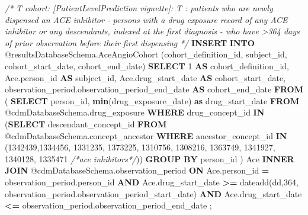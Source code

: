 \documentclass[
]{article}
\newenvironment{Shaded}{\begin{snugshade}}{\end{snugshade}}
\newcommand{\CommentTok}[1]{\textcolor[rgb]{0.56,0.35,0.01}{\textit{#1}}}
\newcommand{\DecValTok}[1]{\textcolor[rgb]{0.00,0.00,0.81}{#1}}
\newcommand{\FunctionTok}[1]{\textcolor[rgb]{0.13,0.29,0.53}{\textbf{#1}}}
\newcommand{\KeywordTok}[1]{\textcolor[rgb]{0.13,0.29,0.53}{\textbf{#1}}}
\newcommand{\NormalTok}[1]{#1}
\newcommand{\OperatorTok}[1]{\textcolor[rgb]{0.81,0.36,0.00}{\textbf{#1}}}
\begin{document}
\begin{Shaded}
\begin{Highlighting}[]
  
  \CommentTok{/*}
\CommentTok{    T cohort:  [PatientLevelPrediction vignette]:  T : patients who are newly }
\CommentTok{  dispensed an ACE inhibitor}
\CommentTok{  {-} persons with a drug exposure record of any \textquotesingle{}ACE inhibitor\textquotesingle{} or }
\CommentTok{  any descendants, indexed at the first diagnosis}
\CommentTok{  {-} who have \textgreater{}364 days of prior observation before their first dispensing}
\CommentTok{  */}
    \KeywordTok{INSERT} \KeywordTok{INTO}\NormalTok{ @resultsDatabaseSchema.AceAngioCohort (cohort\_definition\_id, }
\NormalTok{                                                       subject\_id, }
\NormalTok{                                                       cohort\_start\_date, }
\NormalTok{                                                       cohort\_end\_date)}
  \KeywordTok{SELECT} \DecValTok{1} \KeywordTok{AS}\NormalTok{ cohort\_definition\_id,}
\NormalTok{  Ace.person\_id }\KeywordTok{AS}\NormalTok{ subject\_id,}
\NormalTok{  Ace.drug\_start\_date }\KeywordTok{AS}\NormalTok{ cohort\_start\_date,}
\NormalTok{  observation\_period.observation\_period\_end\_date }\KeywordTok{AS}\NormalTok{ cohort\_end\_date}
  \KeywordTok{FROM}
\NormalTok{  (}
    \KeywordTok{SELECT}\NormalTok{ person\_id, }\FunctionTok{min}\NormalTok{(drug\_exposure\_date) }\KeywordTok{as}\NormalTok{ drug\_start\_date}
    \KeywordTok{FROM}\NormalTok{ @cdmDatabaseSchema.drug\_exposure}
    \KeywordTok{WHERE}\NormalTok{ drug\_concept\_id }\KeywordTok{IN}\NormalTok{ (}\KeywordTok{SELECT}\NormalTok{ descendant\_concept\_id }\KeywordTok{FROM} 
\NormalTok{                              @cdmDatabaseSchema.concept\_ancestor }\KeywordTok{WHERE}\NormalTok{ ancestor\_concept\_id }\KeywordTok{IN} 
\NormalTok{                              (}\DecValTok{1342439}\NormalTok{,}\DecValTok{1334456}\NormalTok{, }\DecValTok{1331235}\NormalTok{, }\DecValTok{1373225}\NormalTok{, }\DecValTok{1310756}\NormalTok{, }\DecValTok{1308216}\NormalTok{, }\DecValTok{1363749}\NormalTok{, }\DecValTok{1341927}\NormalTok{, }\DecValTok{1340128}\NormalTok{, }\DecValTok{1335471} \CommentTok{/*ace inhibitors*/}\NormalTok{))}
    \KeywordTok{GROUP} \KeywordTok{BY}\NormalTok{ person\_id}
\NormalTok{  ) Ace}
  \KeywordTok{INNER} \KeywordTok{JOIN}\NormalTok{ @cdmDatabaseSchema.observation\_period}
  \KeywordTok{ON}\NormalTok{ Ace.person\_id }\OperatorTok{=}\NormalTok{ observation\_period.person\_id}
  \KeywordTok{AND}\NormalTok{ Ace.drug\_start\_date }\OperatorTok{\textgreater{}=}\NormalTok{ dateadd(dd,}\DecValTok{364}\NormalTok{, }
\NormalTok{                                     observation\_period.observation\_period\_start\_date)}
  \KeywordTok{AND}\NormalTok{ Ace.drug\_start\_date }\OperatorTok{\textless{}=}\NormalTok{ observation\_period.observation\_period\_end\_date}
\NormalTok{  ;}
  

\end{Highlighting}
\end{Shaded}
\end{document}
